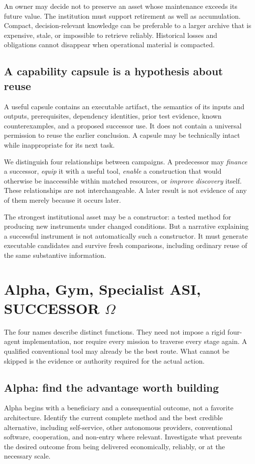 An owner may decide not to preserve an asset whose maintenance exceeds its future value. The institution must support retirement as well as accumulation. Compact, decision-relevant knowledge can be preferable to a larger archive that is expensive, stale, or impossible to retrieve reliably. Historical losses and obligations cannot disappear when operational material is compacted.

\subsection{A capability capsule is a hypothesis about reuse}
A useful capsule contains an executable artifact, the semantics of its inputs and outputs, prerequisites, dependency identities, prior test evidence, known counterexamples, and a proposed successor use. It does not contain a universal permission to reuse the earlier conclusion. A capsule may be technically intact while inappropriate for its next task.

We distinguish four relationships between campaigns. A predecessor may \emph{finance} a successor, \emph{equip} it with a useful tool, \emph{enable} a construction that would otherwise be inaccessible within matched resources, or \emph{improve discovery} itself. These relationships are not interchangeable. A later result is not evidence of any of them merely because it occurs later.

The strongest institutional asset may be a constructor: a tested method for producing new instruments under changed conditions. But a narrative explaining a successful instrument is not automatically such a constructor. It must generate executable candidates and survive fresh comparisons, including ordinary reuse of the same substantive information.

\section{Alpha, Gym, Specialist ASI, SUCCESSOR \texorpdfstring{$\Omega$}{Omega}}
\label{sec:stages}
The four names describe distinct functions. They need not impose a rigid four-agent implementation, nor require every mission to traverse every stage again. A qualified conventional tool may already be the best route. What cannot be skipped is the evidence or authority required for the actual action.

\subsection{Alpha: find the advantage worth building}
Alpha begins with a beneficiary and a consequential outcome, not a favorite architecture. Identify the current complete method and the best credible alternative, including self-service, other autonomous providers, conventional software, cooperation, and non-entry where relevant. Investigate what prevents the desired outcome from being delivered economically, reliably, or at the necessary scale.

